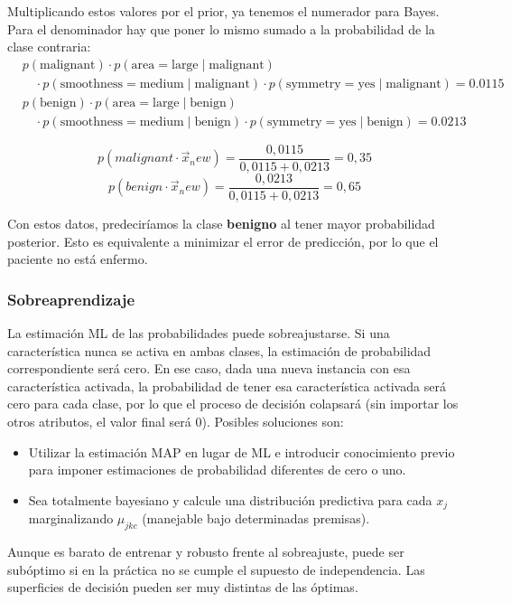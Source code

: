 Multiplicando estos valores por el prior, ya tenemos el numerador para Bayes. Para el denominador hay que poner lo mismo sumado a la probabilidad de la clase contraria:
\begin{align*}
& p(\text{malignant}) \cdot p(\text{area} = \text{large} \mid \text{malignant}) \\
& \quad \cdot p(\text{smoothness} = \text{medium} \mid \text{malignant}) \cdot p(\text{symmetry} = \text{yes} \mid \text{malignant}) = 0.0115 \\
& p(\text{benign}) \cdot p(\text{area} = \text{large} \mid \text{benign}) \\
& \quad \cdot p(\text{smoothness} = \text{medium} \mid \text{benign}) \cdot p(\text{symmetry} = \text{yes} \mid \text{benign}) = 0.0213
\end{align*}

$$p(malignant \cdot \vec{x}_new) = \frac{0,0115}{0,0115 + 0,0213} = 0,35$$
$$p(benign \cdot \vec{x}_new) = \frac{0,0213}{0,0115 + 0,0213} = 0,65$$

Con estos datos, predeciríamos la clase \textbf{benigno} al tener mayor probabilidad posterior. Esto es equivalente a minimizar el error de predicción, por lo que el paciente no está enfermo. 

\subsubsection{Sobreaprendizaje}
La estimación ML de las probabilidades puede sobreajustarse. Si una característica nunca se activa en ambas clases, la estimación de probabilidad correspondiente será cero. En ese caso, dada una nueva instancia con esa característica activada, la probabilidad de tener esa característica activada será cero para cada clase, por lo que el proceso de decisión colapsará (sin importar los otros atributos, el valor final será 0). Posibles soluciones son:
\begin{itemize}
\item Utilizar la estimación MAP en lugar de ML e introducir conocimiento previo para imponer estimaciones de probabilidad diferentes de cero o uno. 
\item Sea totalmente bayesiano y calcule una distribución predictiva para cada $x_j$ marginalizando $\mu_{jkc}$ (manejable bajo determinadas premisas).
\end{itemize}

Aunque es barato de entrenar y robusto frente al sobreajuste, puede ser subóptimo si en la práctica no se cumple el supuesto de independencia. Las superficies de decisión pueden ser muy distintas de las óptimas.

